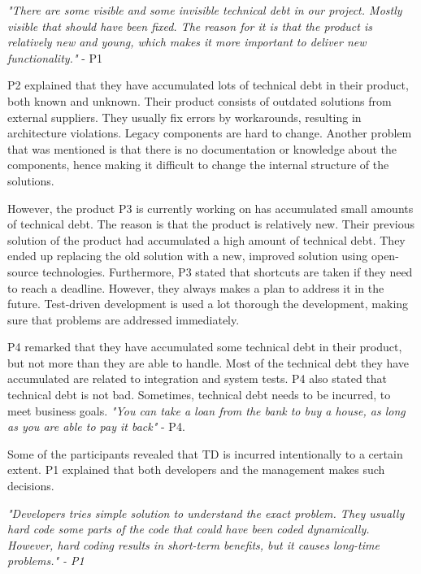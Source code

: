 \begin{displayquote}
\textit{"There are some visible and some invisible technical debt in our project. Mostly visible that should have been fixed. The reason for it is that the product is relatively new and young, which makes it more important to deliver new functionality."} - P1
\end{displayquote} 

P2 explained that they have accumulated lots of technical debt in their product, both known and unknown. Their product consists of outdated solutions from external suppliers. They usually fix errors by workarounds, resulting in architecture violations. Legacy components are hard to change. Another problem that was mentioned is that there is no documentation or knowledge about the components, hence making it difficult to change the internal structure of the solutions.

However, the product P3 is currently working on has accumulated small amounts of technical debt. The reason is that the product is relatively new. Their previous solution of the product had accumulated a high amount of technical debt. They ended up replacing the old solution with a new, improved solution using open-source technologies. Furthermore, P3 stated that shortcuts are taken if they need to reach a deadline. However, they always makes a plan to address it in the future. Test-driven development is used a lot thorough the development, making sure that problems are addressed immediately.

P4 remarked that they have accumulated some technical debt in their product, but not more than they are able to handle. Most of the technical debt they have accumulated are related to integration and system tests. P4 also stated that technical debt is not bad. Sometimes, technical debt needs to be incurred, to meet business goals. \textit{"You can take a loan from the bank to buy a house, as long as you are able to pay it back"} - P4.

Some of the participants revealed that TD is incurred intentionally to a certain extent. P1 explained that both developers and the management makes such decisions. 
\begin{displayquote}
    \textit{"Developers tries simple solution to understand the exact problem. They usually hard code some parts of the code that could have been coded dynamically. However, hard coding results in short-term benefits, but it causes long-time problems." - P1}
\end{displayquote}


